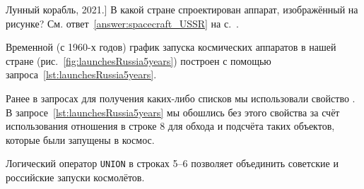 \begin{marginfigure}
{
	\setlength{\fboxsep}{0pt}%
	\setlength{\fboxrule}{1pt}%
}
\caption
[Лунный корабль, 2021.]
{
В какой стране спроектирован аппарат, изображённый на рисунке?
См. ответ~\ref{answer:spacecraft_USSR} на с.~\pageref{answer:spacecraft_USSR}.
}
\label{question:spacecraft_lunar}
\end{marginfigure}

Временной (с 1960-х годов) 
график запуска космических аппаратов в нашей стране (рис.~\ref{fig:launchesRussia5years}) 
построен с помощью запроса~\ref{lst:launchesRussia5years}.%

Ранее в запросах для получения каких-либо списков мы использовали свойство . 
В запросе~\ref{lst:launchesRussia5years} мы обошлись без этого свойства за счёт использования отношения 
 в строке 8 
для обхода и подсчёта таких объектов, которые были запущены в космос.  

Логический оператор \lstinline|UNION| в строках 5--6 
позволяет объединить советские и российские запуски космолётов. 

